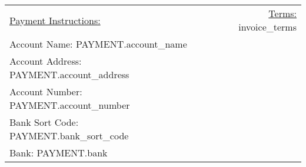 \documentclass{letter}
\begin{document}
\vspace{3 cm}

\begin{tabularx}{\linewidth}{X r}
    \underline{Payment Instructions:} \hspace*{\fill} & \underline{Terms:} {{ invoice_terms }} \\
    Account Name: {{ PAYMENT.account_name }}                                                   \\Account Address: {{ PAYMENT.account_address }} \\Account Number: {{ PAYMENT.account_number }} \\Bank Sort Code: {{ PAYMENT.bank_sort_code }} \\Bank: {{ PAYMENT.bank }}
\end{tabularx}
\end{document}
